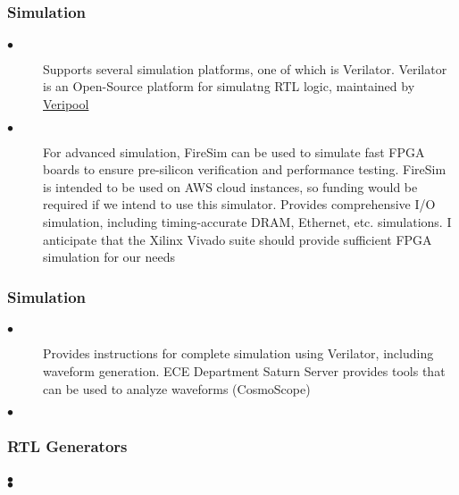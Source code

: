 \documentclass{weeklyslides}
\begin{document}
\subsubsection{Simulation}\label{subsubsec:Simulation}
\begin{frame}
  \frametitle{}
  \begin{description}
  	\item[$\bullet$] Supports several simulation platforms, one of which is Verilator. Verilator is an Open-Source platform for simulatng RTL logic, maintained by \href{https://www.veripool.org/}{Veripool}
  	\item[$\bullet$] For advanced simulation, FireSim can be used to simulate fast FPGA boards to ensure pre-silicon verification and performance testing. FireSim is intended to be used on AWS cloud instances, so funding would be required if we intend to use this simulator. Provides comprehensive I/O simulation, including timing-accurate DRAM, Ethernet, etc. simulations. I anticipate that the Xilinx Vivado suite should provide sufficient FPGA simulation for our needs
  \end{description}
\end{frame}

\subsubsection{Simulation}
\begin{frame}
	\frametitle{}
	\begin{description}
		\item[$\bullet$] Provides instructions for complete simulation using Verilator, including waveform generation. ECE Department Saturn Server provides tools that can be used to analyze waveforms (CosmoScope)
		\item[$\bullet$] 
	\end{description}
\end{frame}


\subsubsection{RTL Generators}\label{subsubsec:RTL Generators}
\begin{frame}
	\frametitle{}
	\begin{description}
		\item[$\bullet$] 
		\item[$\bullet$] 
	\end{description}
\end{frame}
\end{document}
